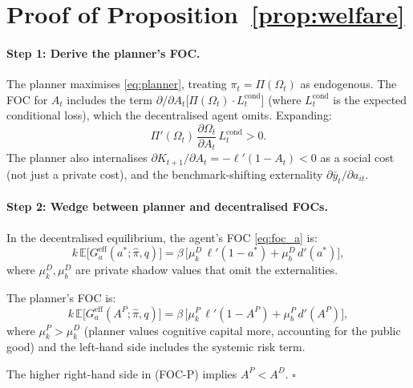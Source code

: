 \documentclass[12pt]{article}
\newcommand{\E}{\mathbb{E}}
\newcommand{\hpi}{\hat{\pi}}
\begin{document}
\section{Proof of Proposition~\ref{prop:welfare}}
\label{app:prop5}

\paragraph{Step 1: Derive the planner's FOC.}
The planner maximises \eqref{eq:planner}, treating $\pi_t = \Pi(\Omega_t)$ as
endogenous. The FOC for $A_t$ includes the term
$\partial / \partial A_t\bigl[\Pi(\Omega_t) \cdot L_t^{\text{cond}}\bigr]$
(where $L_t^{\text{cond}}$ is the expected conditional loss), which the
decentralised agent omits. Expanding:
\[
\Pi'(\Omega_t)\,\frac{\partial \Omega_t}{\partial A_t}\,L_t^{\text{cond}} > 0.
\]
The planner also internalises $\partial K_{t+1}/\partial A_t = -\ell'(1-A_t) < 0$
as a social cost (not just a private cost), and the benchmark-shifting externality
$\partial \bar{y}_t / \partial a_{it}$.

\paragraph{Step 2: Wedge between planner and decentralised FOCs.}
In the decentralised equilibrium, the agent's FOC \eqref{eq:foc_a} is:
\begin{equation}
k\,\E\bigl[G_a^{\text{eff}}(a^*;\hpi, q)\bigr] = \beta\,\bigl[\mu_k^D\,\ell'(1-a^*) + \mu_b^D\,d'(a^*)\bigr],
\tag{FOC-D}
\end{equation}
where $\mu_k^D, \mu_b^D$ are private shadow values that omit the externalities.

The planner's FOC is:
\begin{equation}
k\,\E\bigl[G_a^{\text{eff}}(A^P;\hpi, q)\bigr] = \beta\,\bigl[\mu_k^P\,\ell'(1-A^P) + \mu_b^P\,d'(A^P)\bigr],
\tag{FOC-P}
\end{equation}
where $\mu_k^P > \mu_k^D$ (planner values cognitive capital more, accounting for
the public good) and the left-hand side includes the systemic risk term.

The higher right-hand side in (FOC-P) implies $A^P < A^D$. $\square$
\end{document}
